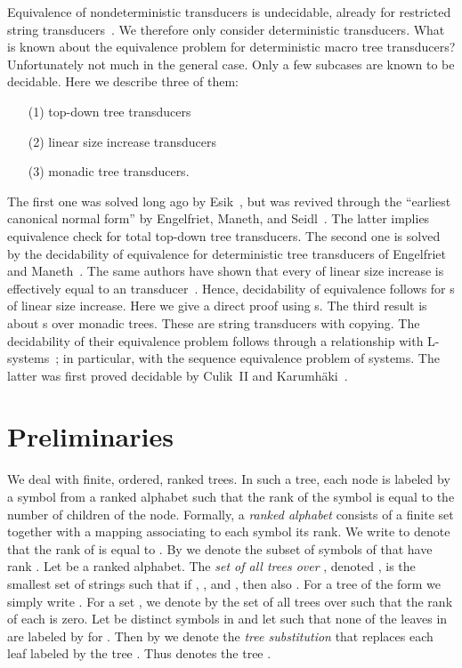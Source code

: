 \documentclass[copyright,creativecommons]{eptcs}
\begin{document}
Equivalence of nondeterministic transducers is undecidable,
already for restricted string transducers~\cite{DBLP:journals/jacm/Griffiths68}. 
We therefore only consider deterministic transducers.
What is known about the equivalence problem for 
deterministic macro tree transducers?
Unfortunately not much in the general case.
Only a few subcases are known to be decidable.
Here we describe three of them:
\begin{enumerate}
\item[(1)] top-down tree transducers
\item[(2)] linear size increase transducers
\item[(3)] monadic tree transducers.
\end{enumerate}
The first one was solved long ago by Esik~\cite{DBLP:journals/actaC/Esik81}, but
was revived through the ``earliest canonical normal form''
by Engelfriet, Maneth, and Seidl~\cite{DBLP:journals/jcss/EngelfrietMS09}. 
The latter implies 
equivalence check for total top-down tree transducers. 
The second one is solved by the decidability of equivalence 
for deterministic  tree transducers of Engelfriet and Maneth~\cite{DBLP:journals/ipl/EngelfrietM06}.
The same authors have shown that every  of linear size increase
is effectively equal to an  transducer~\cite{DBLP:journals/siamcomp/EngelfrietM03}. Hence,
decidability of equivalence follows for s of linear size increase.
Here we give a direct proof using s.
The third result is about s over monadic trees.
These are string transducers with copying. 
The decidability of their equivalence problem follows
through a relationship with L-systems~\cite{DBLP:journals/jcss/EngelfrietRS80};
in particular, with the sequence equivalence problem of  systems.
The latter was first proved decidable by Culik~II and Karumh{\"a}ki~\cite{culkar86}.

\section{Preliminaries}

We deal with finite, ordered, ranked trees.
In such a tree, each node is labeled by a symbol from
a ranked alphabet such that the rank of the symbol is equal
to the number of children of the node.
Formally, a \emph{ranked alphabet} consists of a finite set 
together with a mapping  associating
to each symbol its rank. 
We write  to denote that the rank of  is equal to .
By  we denote the subset of symbols of  that have
rank .
Let  be a ranked alphabet.
The \emph{set of all trees over },
denoted , is the smallest set of strings  such that if
, , and , then also
.
For a tree of the form  we simply write .
For a set , we denote by  the set of all trees over
 such that the rank of each  is zero.
Let  be distinct symbols in  and 
let  such that none of the leaves in  are
labeled by  for .
Then by 
we denote the \emph{tree substitution} that replaces each leaf labeled
 by the tree .
Thus  denotes the tree
.
\end{document}

